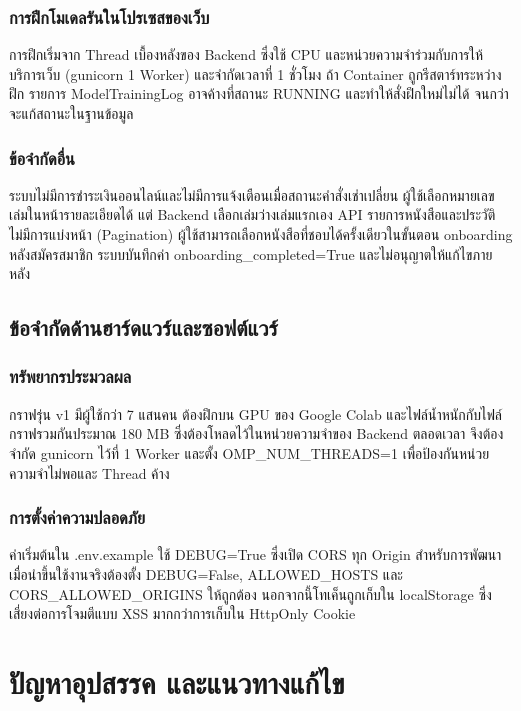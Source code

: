\subsubsection{การฝึกโมเดลรันในโปรเซสของเว็บ}
การฝึกเริ่มจาก Thread เบื้องหลังของ Backend ซึ่งใช้ CPU และหน่วยความจำร่วมกับการให้บริการเว็บ (gunicorn 1 Worker) และจำกัดเวลาที่ 1 ชั่วโมง ถ้า Container ถูกรีสตาร์ทระหว่างฝึก รายการ ModelTrainingLog อาจค้างที่สถานะ RUNNING และทำให้สั่งฝึกใหม่ไม่ได้ จนกว่าจะแก้สถานะในฐานข้อมูล

\subsubsection{ข้อจำกัดอื่น}
ระบบไม่มีการชำระเงินออนไลน์และไม่มีการแจ้งเตือนเมื่อสถานะคำสั่งเช่าเปลี่ยน ผู้ใช้เลือกหมายเลขเล่มในหน้ารายละเอียดได้ แต่ Backend เลือกเล่มว่างเล่มแรกเอง API รายการหนังสือและประวัติไม่มีการแบ่งหน้า (Pagination) ผู้ใช้สามารถเลือกหนังสือที่ชอบได้ครั้งเดียวในขั้นตอน onboarding หลังสมัครสมาชิก ระบบบันทึกค่า onboarding\_completed=True และไม่อนุญาตให้แก้ไขภายหลัง

\subsection{ข้อจำกัดด้านฮาร์ดแวร์และซอฟต์แวร์}

\subsubsection{ทรัพยากรประมวลผล}
กราฟรุ่น v1 มีผู้ใช้กว่า 7 แสนคน ต้องฝึกบน GPU ของ Google Colab และไฟล์น้ำหนักกับไฟล์กราฟรวมกันประมาณ 180 MB ซึ่งต้องโหลดไว้ในหน่วยความจำของ Backend ตลอดเวลา จึงต้องจำกัด gunicorn ไว้ที่ 1 Worker และตั้ง OMP\_NUM\_THREADS=1 เพื่อป้องกันหน่วยความจำไม่พอและ Thread ค้าง 

\subsubsection{การตั้งค่าความปลอดภัย}
ค่าเริ่มต้นใน .env.example ใช้ DEBUG=True ซึ่งเปิด CORS ทุก Origin สำหรับการพัฒนา เมื่อนำขึ้นใช้งานจริงต้องตั้ง DEBUG=False, ALLOWED\_HOSTS และ CORS\_ALLOWED\_ORIGINS ให้ถูกต้อง นอกจากนี้โทเค็นถูกเก็บใน localStorage ซึ่งเสี่ยงต่อการโจมตีแบบ XSS มากกว่าการเก็บใน HttpOnly Cookie

\section{ปัญหาอุปสรรค และแนวทางแก้ไข}

